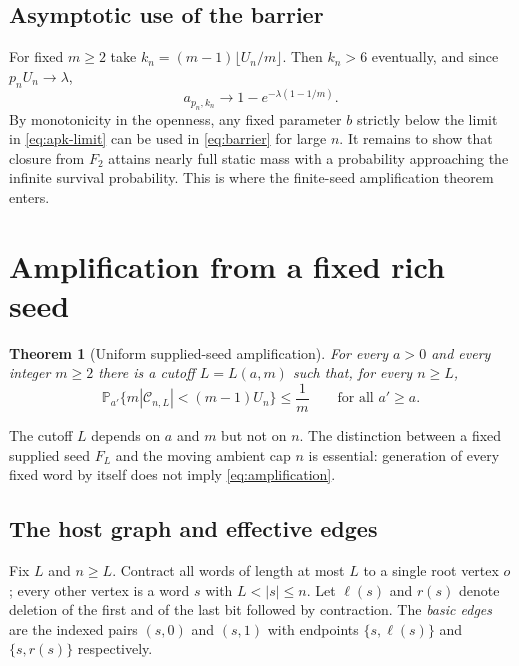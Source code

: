 \documentclass[11pt,reqno]{amsart}
\theoremstyle{plain}
\newtheorem{theorem}{Theorem}[section]
\theoremstyle{definition}
\theoremstyle{remark}
\numberwithin{equation}{section}
\newcommand{\Prob}{\mathbb{P}}
\newcommand{\cC}{\mathcal{C}}
\begin{document}
\subsection*{Asymptotic use of the barrier}
For fixed $m\ge2$ take $k_n=(m-1)\lfloor U_n/m\rfloor$. Then $k_n>6$ eventually, and since $p_nU_n\to\lambda$,
\begin{equation}\label{eq:apk-limit}
a_{p_n,k_n}\longrightarrow1-e^{-\lambda(1-1/m)}.
\end{equation}
By monotonicity in the openness, any fixed parameter $b$ strictly below the limit in \eqref{eq:apk-limit} can be used in \eqref{eq:barrier} for large $n$. It remains to show that closure from $F_2$ attains nearly full static mass with a probability approaching the infinite survival probability. This is where the finite-seed amplification theorem enters.

\section{Amplification from a fixed rich seed}\label{sec:amplification}

\begin{theorem}[Uniform supplied-seed amplification]\label{thm:amplification}
For every $a>0$ and every integer $m\ge2$ there is a cutoff $L=L(a,m)$ such that, for every $n\ge L$,
\begin{equation}\label{eq:amplification}
\Prob_{a'}\bigl\{m|\cC_{n,L}|<(m-1)U_n\bigr\}\le\frac1m\qquad\text{for all }a'\ge a.
\end{equation}
\end{theorem}

The cutoff $L$ depends on $a$ and $m$ but not on $n$. The distinction between a fixed supplied seed $F_L$ and the moving ambient cap $n$ is essential: generation of every fixed word by itself does not imply \eqref{eq:amplification}.

\subsection{The host graph and effective edges}
Fix $L$ and $n\ge L$. Contract all words of length at most $L$ to a single root vertex $o$; every other vertex is a word $s$ with $L<|s|\le n$. Let $\ell(s)$ and $r(s)$ denote deletion of the first and of the last bit followed by contraction. The \emph{basic edges} are the indexed pairs $(s,0)$ and $(s,1)$ with endpoints $\{s,\ell(s)\}$ and $\{s,r(s)\}$ respectively.
\end{document}
